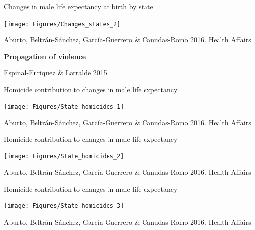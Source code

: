\documentclass[xcolor={dvipsnames}]{beamer}
\begin{document}
\begin{frame}
	\Large{Changes in male life expectancy at birth by state}


	\begin{center}
		\texttt{[image: Figures/Changes\_states\_2]}
	\end{center}
	
	\tiny{Aburto, Beltr\'an-S\'anchez, Garc\'ia-Guerrero \& Canudas-Romo 2016. Health Affairs}				
\end{frame}



\begin{frame}
	\huge{
	\begin{center}
		\bf{Propagation of violence}\linebreak
	\end{center}
		}

	\begin{center}		
	\end{center}

	\tiny{Espinal-Enriquez \& Larralde 2015}
\end{frame}


\begin{frame}
	\begin{center}
		\large{Homicide contribution to changes in male life expectancy}
	\end{center}

	\begin{center}
		\texttt{[image: Figures/State\_homicides\_1]}
	\end{center}
	
	\tiny{Aburto, Beltr\'an-S\'anchez, Garc\'ia-Guerrero \& Canudas-Romo 2016. Health Affairs}				
\end{frame}


\begin{frame}
	\begin{center}
\large{Homicide contribution to changes in male life expectancy}
	\end{center}


	\begin{center}
		\texttt{[image: Figures/State\_homicides\_2]}
	\end{center}
	
	\tiny{Aburto, Beltr\'an-S\'anchez, Garc\'ia-Guerrero \& Canudas-Romo 2016. Health Affairs}				
\end{frame}

\begin{frame}
	\begin{center}
\large{Homicide contribution to changes in male life expectancy}
	\end{center}


	\begin{center}
		\texttt{[image: Figures/State\_homicides\_3]}
	\end{center}
	
	\tiny{Aburto, Beltr\'an-S\'anchez, Garc\'ia-Guerrero \& Canudas-Romo 2016. Health Affairs}				
\end{frame}
\end{document}
